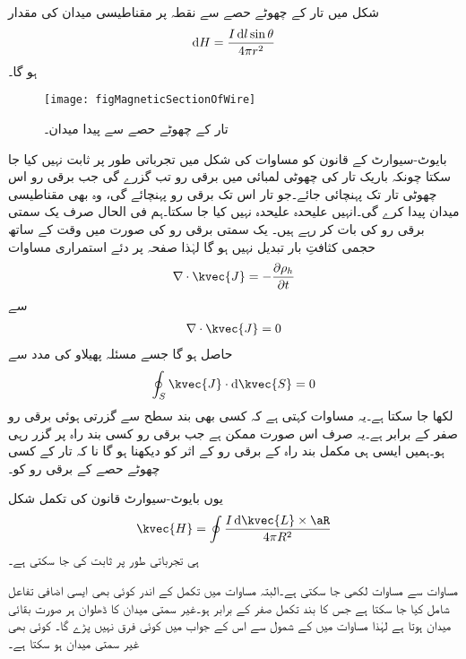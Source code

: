 شکل  میں تار کے چھوٹے حصے  سے نقطہ  پر مقناطیسی میدان کی مقدار
\begin{align}\label{مساوات_مقناطیسی_تار_کا_ٹکڑا_اور_میدان}
\dif H=\frac{I \dif l \sin \theta}{4\pi r^2}
\end{align}
ہو گا۔

\begin{figure}
\centering
\texttt{[image: figMagneticSectionOfWire]}
\caption{تار کے چھوٹے حصے سے پیدا میدان۔}
\label{شکل_مقناطیسی_تار_کا_ٹکڑا_اور_میدان}
\end{figure}
بایوٹ-سیوارٹ کے قانون کو مساوات  کی شکل میں تجرباتی طور پر ثابت نہیں کیا جا سکتا چونکہ باریک تار کی چھوٹی لمبائی میں برقی رو تب گزرے گی جب برقی رو اس چھوٹی تار تک پہنچائی جائے۔جو تار اس تک برقی رو پہنچائے گی، وہ بھی مقناطیسی میدان پیدا کرے گی۔انہیں علیحدہ علیحدہ نہیں کیا جا سکتا۔ہم فی الحال صرف یک سمتی برقی رو کی بات کر رہے ہیں۔ یک سمتی برقی رو کی صورت میں وقت کے ساتھ حجمی کثافتِ بار تبدیل نہیں ہو گا لہٰذا صفحہ  پر دئے  استمراری مساوات
\begin{align*}
\nabla \cdot \kvec{J}=-\frac{\partial \rho_h}{\partial t}
\end{align*}
سے
\begin{align}\label{مساوات_مقناطیسی_صرف_مکمل_بند_راہ}
\nabla \cdot \kvec{J}=0
\end{align}
حاصل ہو گا جسے مسئلہ پھیلاو کی مدد سے
\begin{align*}
\oint_S  \kvec{J} \cdot \dif \kvec{S}=0
\end{align*}
لکھا جا سکتا ہے۔یہ مساوات کہتی ہے کہ کسی بھی بند سطح سے گزرتی ہوئی برقی رو صفر کے برابر ہے۔یہ صرف اس صورت ممکن ہے جب برقی رو کسی بند راہ پر گزر رہی ہو۔ہمیں ایسی ہی مکمل بند راہ کے برقی رو کے اثر کو دیکھنا ہو گا نا کہ تار کے کسی چھوٹے حصے  کے برقی رو کو۔ 

یوں بایوٹ-سیوارٹ قانون کی تکمل شکل
\begin{align}\label{مساوات_بایوٹ_سیوارٹ_تکمل_شکل}
\kvec{H}=\oint \frac{I \dif \kvec{L} \times \aR}{4 \pi R^2}
\end{align}
ہی تجرباتی طور پر ثابت کی جا سکتی ہے۔

مساوات  سے مساوات  لکھی جا سکتی ہے۔البتہ مساوات  میں تکمل کے اندر کوئی بھی ایسی اضافی تفاعل شامل کیا جا سکتا ہے جس کا بند تکمل صفر کے برابر ہو۔غیر سمتی میدان کا ڈھلوان ہر صورت بقائی میدان ہوتا ہے لہٰذا مساوات  میں  کے شمول سے اس کے جواب میں کوئی فرق نہیں پڑے گا۔ کوئی بھی غیر سمتی میدان ہو سکتا ہے۔

